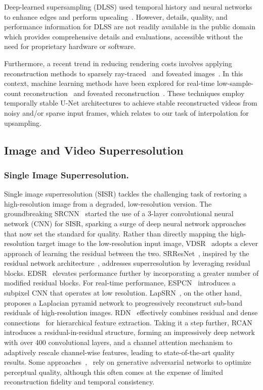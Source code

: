 Deep-learned supersampling (DLSS) used temporal history and neural networks to enhance edges and perform upscaling~\cite{edelsten2019truly}. However, details, quality, and performance information for DLSS are not readily available in the public domain which provides comprehensive details and evaluations, accessible without the need for proprietary hardware or software.

Furthermore, a recent trend in reducing rendering costs involves applying reconstruction methods to sparsely ray-traced~\cite{schied2017spatiotemporal} and foveated images~\cite{patney2016towards}. In this context, machine learning methods have been explored for real-time low-sample-count reconstruction~\cite{chaitanya2017interactive} and foveated reconstruction~\cite{kaplanyan2019deepfovea}. These techniques employ temporally stable U-Net architectures to achieve stable reconstructed videos from noisy and/or sparse input frames, which relates to our task of interpolation for upsampling.

\subsection{Image and Video Superresolution}

\subsubsection{Single Image Superresolution.}
Single image superresolution (SISR) tackles the challenging task of restoring a high-resolution image from a degraded, low-resolution version. The groundbreaking SRCNN~\cite{dong2015image} started the use of a 3-layer convolutional neural network (CNN) for SISR, sparking a surge of deep neural network approaches that now set the standard for quality. Rather than directly mapping the high-resolution target image to the low-resolution input image, VDSR~\cite{kim2016accurate} adopts a clever approach of learning the residual between the two. SRResNet~\cite{ledig2017photo}, inspired by the residual network architecture~\cite{he2016deep}, addresses superresolution by leveraging residual blocks. EDSR~\cite{lim2017enhanced} elevates performance further by incorporating a greater number of modified residual blocks. For real-time performance, ESPCN~\cite{shi2016real} introduces a subpixel CNN that operates at low resolution. LapSRN~\cite{lai2017deep}, on the other hand, proposes a Laplacian pyramid network to progressively reconstruct sub-band residuals of high-resolution images. RDN~\cite{zhang2018residual} effectively combines residual and dense connections~\cite{huang2017densely} for hierarchical feature extraction. Taking it a step further, RCAN~\cite{zhang2018image} introduces a residual-in-residual structure, forming an impressively deep network with over 400 convolutional layers, and a channel attention mechanism to adaptively rescale channel-wise features, leading to state-of-the-art quality results. Some approaches~\cite{ge2018image},~\cite{ledig2017photo} rely on generative adversarial networks to optimize perceptual quality, although this often comes at the expense of limited reconstruction fidelity and temporal consistency.

